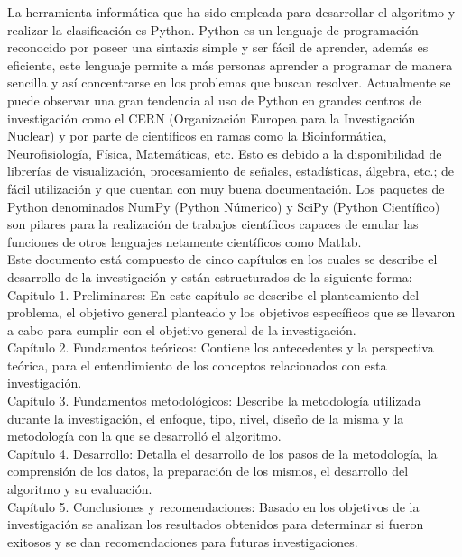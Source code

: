 La herramienta informática que ha sido empleada para desarrollar el algoritmo y realizar
la clasificación es Python. Python es un lenguaje de programación reconocido por poseer
una sintaxis simple y ser fácil de aprender, además es eficiente, este lenguaje permite
 a más personas aprender a programar de manera sencilla y así concentrarse en los
 problemas que buscan resolver. Actualmente se puede observar una gran tendencia al
 uso de Python en grandes centros de investigación como el CERN (Organización Europea
 para la Investigación Nuclear) y por parte de científicos en ramas como la Bioinformática,
  Neurofisiología, Física, Matemáticas, etc. Esto es debido a la disponibilidad de
  librerías de visualización, procesamiento de señales, estadísticas, álgebra, etc.;
  de fácil utilización y que cuentan con muy buena documentación. Los paquetes de
  Python denominados NumPy (Python Númerico) y SciPy (Python Científico) son pilares
  para la realización de trabajos científicos capaces de emular las funciones de otros
  lenguajes netamente científicos como Matlab.\\

Este documento está compuesto de cinco capítulos en los cuales se describe el desarrollo  de la
investigación y están estructurados de la siguiente forma:\\

Capitulo 1. Preliminares: En este capítulo se describe el planteamiento del problema,
el objetivo general planteado y los objetivos específicos que se llevaron a cabo para cumplir con el
objetivo general de  la investigación.\\

Capítulo 2. Fundamentos teóricos: Contiene los antecedentes y la perspectiva teórica, para el
entendimiento de los conceptos relacionados con esta investigación.\\

Capítulo 3. Fundamentos metodológicos: Describe la metodología utilizada durante la investigación, el
enfoque, tipo, nivel, dise\~no de la misma y la metodología con la que se desarrolló el algoritmo.\\

Capítulo 4. Desarrollo: Detalla el desarrollo de los pasos de la metodología, la
comprensión de los datos, la preparación de los mismos, el desarrollo del algoritmo y su
evaluación.\\

Capítulo 5. Conclusiones y recomendaciones: Basado en los objetivos de la investigación
se analizan los resultados obtenidos para determinar si fueron exitosos y se dan
recomendaciones para futuras investigaciones.\\


